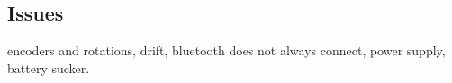\subsection{Issues}
encoders and rotations, drift, bluetooth does not always connect, power supply, battery sucker.




